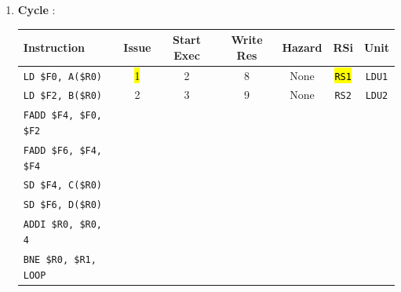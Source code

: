 \noindent
\answer
\begin{enumerate}
    \item \textbf{Cycle \theenumi}:
    
    \begin{table}[!htp]
        \centering
        \begin{adjustbox}{width={\textwidth},totalheight={\textheight},keepaspectratio}
        \begin{tabular}{@{} l c c c c c c @{}}
            \toprule
            \textbf{Instruction} & \textbf{Issue} & \textbf{Start Exec} & \textbf{Write Res} & \textbf{Hazard} & \textbf{RSi} & \textbf{Unit} \\
            \midrule
            \texttt{LD \$F0, A(\$R0)}       & \hl{1} & 2 & 8 & None  & \hl{\texttt{RS1}}   & \texttt{LDU1}  \\ [.5em]
            \texttt{LD \$F2, B(\$R0)}       & 2 & 3 & 9 & None  & \texttt{RS2}   & \texttt{LDU2}  \\ [.5em]
            \texttt{FADD \$F4, \$F0, \$F2}  &   &   &   &       &       &       \\ [.5em]
            \texttt{FADD \$F6, \$F4, \$F4}  &   &   &   &       &       &       \\ [.5em]
            \texttt{SD \$F4, C(\$R0)}       &   &   &   &       &       &       \\ [.5em]
            \texttt{SD \$F6, D(\$R0)}       &   &   &   &       &       &       \\ [.5em]
            \texttt{ADDI \$R0, \$R0, 4}     &   &   &   &       &       &       \\ [.5em]
            \texttt{BNE \$R0, \$R1, LOOP}   &   &   &   &       &       &       \\
            \bottomrule
        \end{tabular}
        \end{adjustbox}
    \end{table}
    

\end{enumerate}
